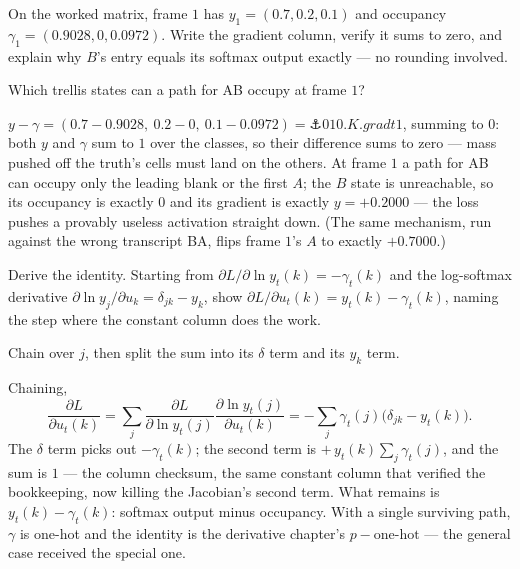 \begin{problem}
On the worked matrix, frame $1$ has $y_1 = (0.7, 0.2, 0.1)$ and
occupancy $\gamma_1 = (0.9028, 0, 0.0972)$. Write the gradient
column, verify it sums to zero, and explain why $B$'s entry equals
its softmax output exactly — no rounding involved.
\begin{hint}
Which trellis states can a path for AB occupy at frame $1$?
\end{hint}
\begin{solution}
$y - \gamma = (0.7 - 0.9028,\ 0.2 - 0,\ 0.1 - 0.0972) =
\anchor{010.K.gradt1}$, summing to $0$: both $y$ and
$\gamma$ sum to $1$ over the classes, so their difference sums to
zero — mass pushed off the truth's cells must land on the others. At
frame $1$ a path for AB can occupy only the leading blank or the
first $A$; the $B$ state is unreachable, so its occupancy is exactly
$0$ and its gradient is exactly $y = +0.2000$ — the loss pushes a
provably useless activation straight down. (The same mechanism, run
against the wrong transcript BA, flips frame $1$'s $A$ to exactly
$+0.7000$.)
\end{solution}
\end{problem}

\begin{problem}
Derive the identity. Starting from
$\partial L / \partial \ln y_t(k) = -\gamma_t(k)$ and the
log-softmax derivative
$\partial \ln y_j / \partial u_k = \delta_{jk} - y_k$, show
$\partial L / \partial u_t(k) = y_t(k) - \gamma_t(k)$, naming the
step where the constant column does the work.
\begin{hint}
Chain over $j$, then split the sum into its $\delta$ term and its
$y_k$ term.
\end{hint}
\begin{solution}
Chaining,
\[
  \frac{\partial L}{\partial u_t(k)}
  = \sum_j \frac{\partial L}{\partial \ln y_t(j)}
    \frac{\partial \ln y_t(j)}{\partial u_t(k)}
  = -\sum_j \gamma_t(j) \bigl(\delta_{jk} - y_t(k)\bigr) .
\]
The $\delta$ term picks out $-\gamma_t(k)$; the second term is
$+\,y_t(k) \sum_j \gamma_t(j)$, and the sum is $1$ — the column
checksum, the same constant column that verified the bookkeeping,
now killing the Jacobian's second term. What remains is
$y_t(k) - \gamma_t(k)$: softmax output minus occupancy. With a
single surviving path, $\gamma$ is one-hot and the identity is the
derivative chapter's $p - \text{one-hot}$ — the general case
received the special one.
\end{solution}
\end{problem}

